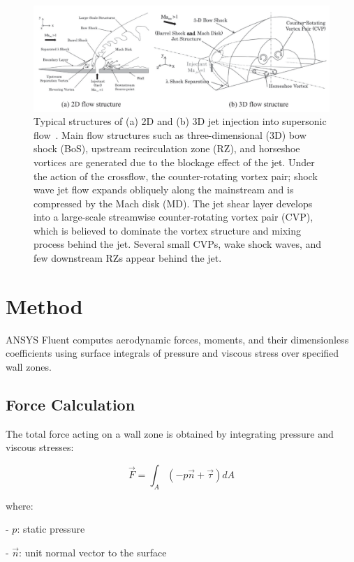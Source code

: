 \documentclass[12pt]{article}
\begin{document}
\begin{figure}[H]
    \centering
    \includegraphics[width=\linewidth]{figs/Screenshot from 2025-06-26 10-16-26.png}
    \caption{Typical structures of (a) 2D and (b) 3D jet injection into supersonic flow~\cite{hill2004hybrid}. Main flow structures such as three-dimensional (3D) bow shock (BoS), upstream recirculation zone (RZ), and horseshoe vortices are generated due to the blockage effect of the jet. Under the action of the crossflow, the counter-rotating vortex pair; shock wave jet flow expands obliquely along the mainstream and is compressed by the Mach disk (MD). The jet shear layer develops into a large-scale streamwise counter-rotating vortex pair (CVP), which is believed to dominate the vortex structure and mixing process behind the jet. Several small CVPs, wake shock waves, and few downstream RZs appear behind the jet.}
    \label{fig:jet2d3d}
\end{figure}

\section{Method}\label{sec:method}
ANSYS Fluent computes aerodynamic forces, moments, and their dimensionless coefficients using surface integrals of pressure and viscous stress over specified wall zones. 

\subsection{Force Calculation}
The total force acting on a wall zone is obtained by integrating pressure and viscous stresses:

$$
\vec{F} = \int_{A} \left( -p \vec{n} + \vec{\tau} \right) dA
$$

where:
   
- $ p $: static pressure
    
- $ \vec{n} $: unit normal vector to the surface
    
\end{document}

